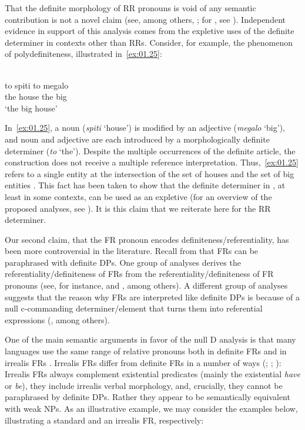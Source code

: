 \documentclass[output=paper]{langsci/langscibook}
\begin{document}
That the definite morphology of \gls{RR} pronouns is void of any semantic
contribution is not a novel claim (see, among others,
\citealt[80]{Bianchi1999}; for , see \citealt{Alexiadou1998}). Independent
evidence in support of this analysis comes from the expletive uses of the 
definite determiner in contexts other than \glspl{RR}.  Consider, for example, the
phenomenon of polydefiniteness, illustrated in~\eqref{ex:01.25}:

\ea {}\label{ex:01.25}\\
	\gll to    spiti   to   megalo\\
		the house the big\\
    \trans \enquote*{the big house}
\z

In~\eqref{ex:01.25}, a noun (\emph{spiti} ‘house’) is modified by an adjective
(\emph{megalo} ‘big’), and noun and adjective are each introduced by a
morphologically definite determiner (\emph{to} ‘the’).  Despite the multiple
occurrences of the definite article, the construction does not receive a
multiple reference interpretation. Thus,~\eqref{ex:01.25} refers to a single entity at the
intersection of the set of houses and the set of big entities
\parencite{LekSze2012}. This fact has been taken to show that the definite
determiner in , at least in some contexts, can be used as an expletive
(for an overview of the proposed analyses, see \citealt{Alexiadou2014b}). It is
this claim that we reiterate here for the \gls{RR} determiner.

Our second claim, that the \gls{FR} pronoun encodes
definiteness/referentiality, has been more controversial in the literature.
Recall from  that \glspl{FR} can be paraphrased with
definite DPs. One group of analyses derives the referentiality/definiteness of
\glspl{FR} from the referentiality/definiteness of \gls{FR} pronouns (see, for
instance, \citealt{Jacobson1995} and \citealt{Pancheva2000}, among others). A
different group of analyses suggests that the reason why \glspl{FR} are
interpreted like definite DPs is because of a null c-commanding
determiner/element that turns them into referential expressions
(\citealt{GrovanRie1981,Caponigro2003,GroLan1998}, among others).

One of the main semantic arguments in favor of the null D analysis is that many
languages use the same range of relative pronouns both in definite \glspl{FR}
and in irrealis \glspl{FR} \citep{Caponigro2003}. Irrealis \glspl{FR} differ
from definite \glspl{FR} in a number of ways (\citealt{Caponigro2003};
\citealt{Pancheva2000}; \citealt{GroLan1998}): Irrealis \glspl{FR} always
complement existential predicates (mainly the existential \emph{have} or
\emph{be}), they include irrealis verbal morphology, and, crucially, they
cannot be paraphrased by definite DPs.  Rather they appear to be semantically
equivalent with weak NPs. As an illustrative example, we may consider the
 examples below, illustrating a standard and an irrealis \gls{FR},
respectively:
\end{document}
